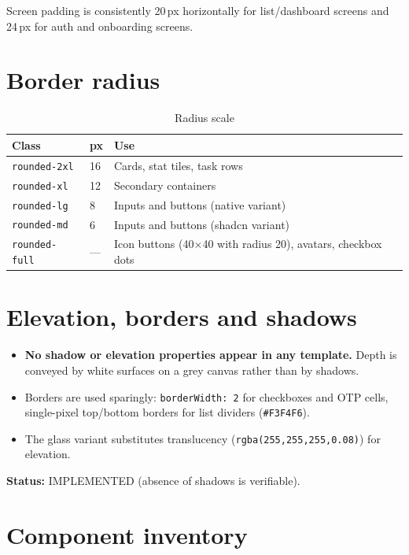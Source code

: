 Screen padding is consistently 20\,px horizontally for list/dashboard screens and
24\,px for auth and onboarding screens.

\section{Border radius}

\begin{table}[H]
\centering
\caption{Radius scale}
\begin{tabular}{p{3.4cm}p{2.2cm}p{8.2cm}}
\toprule
\textbf{Class} & \textbf{px} & \textbf{Use} \\
\midrule
\texttt{rounded-2xl} & 16 & Cards, stat tiles, task rows \\
\texttt{rounded-xl} & 12 & Secondary containers \\
\texttt{rounded-lg} & 8 & Inputs and buttons (native variant) \\
\texttt{rounded-md} & 6 & Inputs and buttons (shadcn variant) \\
\texttt{rounded-full} & --- & Icon buttons (40$\times$40 with radius 20), avatars,
checkbox dots \\
\bottomrule
\end{tabular}
\end{table}

\section{Elevation, borders and shadows}

\begin{itemize}
  \item \textbf{No shadow or elevation properties appear in any template.} Depth is
        conveyed by white surfaces on a grey canvas rather than by shadows.
  \item Borders are used sparingly: \texttt{borderWidth: 2} for checkboxes and OTP
        cells, single-pixel top/bottom borders for list dividers
        (\texttt{\#F3F4F6}).
  \item The glass variant substitutes translucency
        (\texttt{rgba(255,255,255,0.08)}) for elevation.
\end{itemize}

\textbf{Status:} IMPLEMENTED (absence of shadows is verifiable).

\section{Component inventory}

